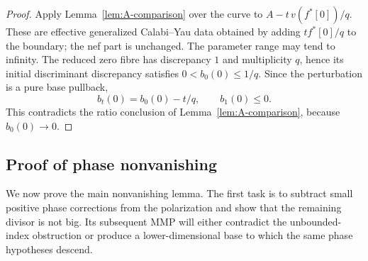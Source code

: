 \begin{proof}
Apply Lemma~\ref{lem:A-comparison} over the curve to
$A-t\,v(f^*[0])/q$.  These are effective generalized
Calabi--Yau data obtained by adding $tf^*[0]/q$ to the boundary;
the nef part is unchanged.  The parameter range may tend to
infinity.  The reduced zero fibre has discrepancy $1$ and
multiplicity $q$, hence its initial discriminant discrepancy
satisfies $0<b_0(0)\le1/q$.  Since the perturbation is a pure
base pullback,
\[
 b_t(0)=b_0(0)-t/q,
 \qquad b_1(0)\le0.
\]
This contradicts the ratio conclusion of
Lemma~\ref{lem:A-comparison}, because $b_0(0)\to0$.
\end{proof}

\subsection{Proof of phase nonvanishing}

We now prove the main nonvanishing lemma.  The first task is to subtract
small positive phase corrections from the polarization and show that the
remaining divisor is not big.  Its subsequent MMP will either contradict
the unbounded-index obstruction or produce a lower-dimensional base to
which the same phase hypotheses descend.

